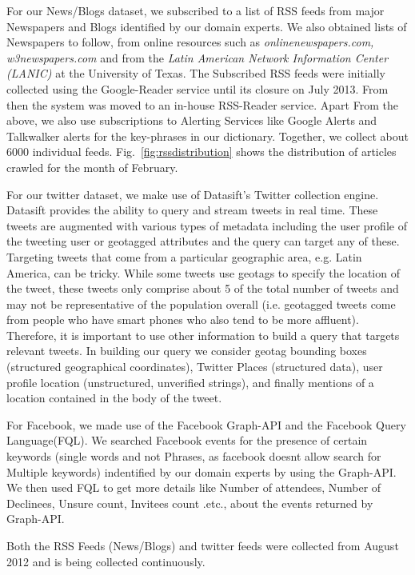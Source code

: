 For our News/Blogs dataset, we subscribed to a list of RSS feeds from major Newspapers and Blogs identified by our domain experts. We also obtained lists of Newspapers to follow, from online resources such as {\em onlinenewspapers.com, w3newspapers.com} and from the {\em Latin American Network Information Center (LANIC)} at the University of Texas. The Subscribed RSS feeds were initially collected using the Google-Reader service until its closure on July 2013. From then the system was moved to an in-house RSS-Reader service. Apart From the above, we also use subscriptions to Alerting Services like Google Alerts and Talkwalker alerts for the key-phrases in our dictionary.
Together, we collect about 6000 individual feeds.
Fig.~\ref{fig:rssdistribution} shows the distribution of articles crawled for the month of February.

For our twitter dataset, we  make use of Datasift’s
Twitter collection engine. Datasift provides the ability to
query and stream tweets in real time. These tweets are
augmented with various types of metadata including the user
profile of the tweeting user or geotagged attributes and the
query can target any of these. Targeting tweets that come
from a particular geographic area, e.g. Latin America, can
be tricky. While some tweets use geotags to specify the
location of the tweet, these tweets only comprise about 5%
of the total number of tweets and may not be representative
of the population overall (i.e. geotagged tweets come from
people who have smart phones who also tend to be more
affluent). Therefore, it is important to use other information
to build a query that targets relevant tweets. In building
our query we consider geotag bounding boxes (structured
geographical coordinates), Twitter Places (structured data),
user profile location (unstructured, unverified strings), and
finally mentions of a location contained in the body of the
tweet.

For Facebook, we made use of the Facebook Graph-API and the Facebook Query Language(FQL). We searched Facebook events for the presence of certain keywords (single words and not Phrases, as facebook doesnt allow search for Multiple keywords) indentified by our domain experts by using the Graph-API. We then used FQL to get more details like Number of attendees, Number of Declinees, Unsure count, Invitees count .etc., about the events returned by Graph-API.


Both the RSS Feeds (News/Blogs) and twitter feeds were collected from August 2012 and is being collected continuously.
